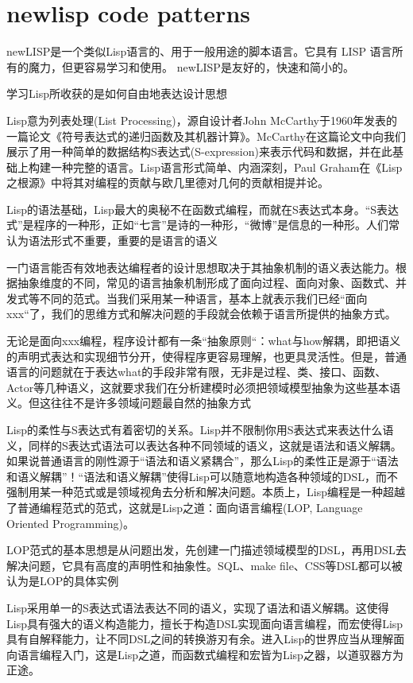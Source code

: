 \documentclass[cn,11pt]{elegantbook}
\begin{document}
\section{newlisp code patterns}


newLISP是一个类似Lisp语言的、用于一般用途的脚本语言。它具有 LISP 语言所有的魔力，但更容易学习和使用。 newLISP是友好的，快速和简小的。

学习Lisp所收获的是如何自由地表达设计思想


Lisp意为列表处理(List Processing)，源自设计者John McCarthy于1960年发表的一篇论文《符号表达式的递归函数及其机器计算》。McCarthy在这篇论文中向我们展示了用一种简单的数据结构S表达式(S-expression)来表示代码和数据，并在此基础上构建一种完整的语言。Lisp语言形式简单、内涵深刻，Paul Graham在《Lisp之根源》中将其对编程的贡献与欧几里德对几何的贡献相提并论。

Lisp的语法基础，Lisp最大的奥秘不在函数式编程，而就在S表达式本身。“S表达式”是程序的一种形，正如“七言”是诗的一种形，“微博”是信息的一种形。人们常认为语法形式不重要，重要的是语言的语义

一门语言能否有效地表达编程者的设计思想取决于其抽象机制的语义表达能力。根据抽象维度的不同，常见的语言抽象机制形成了面向过程、面向对象、函数式、并发式等不同的范式。当我们采用某一种语言，基本上就表示我们已经“面向xxx“了，我们的思维方式和解决问题的手段就会依赖于语言所提供的抽象方式。

无论是面向xxx编程，程序设计都有一条“抽象原则“：what与how解耦，即把语义的声明式表达和实现细节分开，使得程序更容易理解，也更具灵活性。但是，普通语言的问题就在于表达what的手段非常有限，无非是过程、类、接口、函数、Actor等几种语义，这就要求我们在分析建模时必须把领域模型抽象为这些基本语义。但这往往不是许多领域问题最自然的抽象方式

Lisp的柔性与S表达式有着密切的关系。Lisp并不限制你用S表达式来表达什么语义，同样的S表达式语法可以表达各种不同领域的语义，这就是语法和语义解耦。如果说普通语言的刚性源于“语法和语义紧耦合”，那么Lisp的柔性正是源于“语法和语义解耦”！“语法和语义解耦”使得Lisp可以随意地构造各种领域的DSL，而不强制用某一种范式或是领域视角去分析和解决问题。本质上，Lisp编程是一种超越了普通编程范式的范式，这就是Lisp之道：面向语言编程(LOP, Language Oriented Programming)。

LOP范式的基本思想是从问题出发，先创建一门描述领域模型的DSL，再用DSL去解决问题，它具有高度的声明性和抽象性。SQL、make file、CSS等DSL都可以被认为是LOP的具体实例

Lisp采用单一的S表达式语法表达不同的语义，实现了语法和语义解耦。这使得Lisp具有强大的语义构造能力，擅长于构造DSL实现面向语言编程，而宏使得Lisp具有自解释能力，让不同DSL之间的转换游刃有余。进入Lisp的世界应当从理解面向语言编程入门，这是Lisp之道，而函数式编程和宏皆为Lisp之器，以道驭器方为正途。
\end{document}
